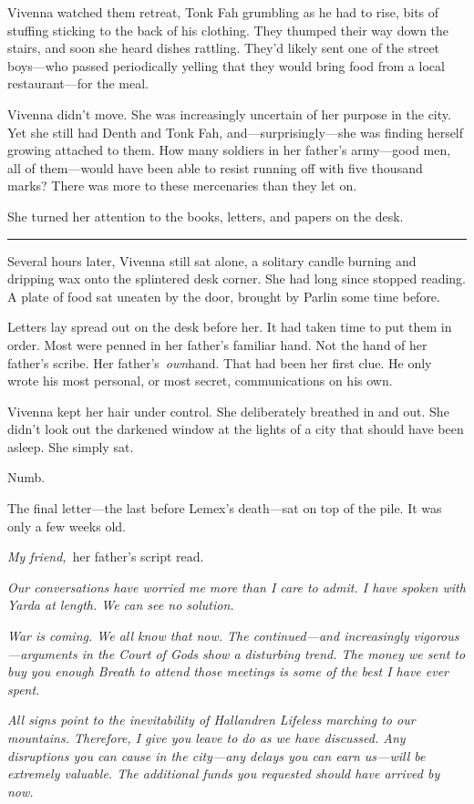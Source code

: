 Vivenna watched them retreat, Tonk Fah grumbling as he had to rise, bits of stuffing sticking to the back of his clothing. They thumped their way down the stairs, and soon she heard dishes rattling. They’d likely sent one of the street boys—who passed periodically yelling that they would bring food from a local restaurant—for the meal.

Vivenna didn’t move. She was increasingly uncertain of her purpose in the city. Yet she still had Denth and Tonk Fah, and—surprisingly—she was finding herself growing attached to them. How many soldiers in her father’s army—good men, all of them—would have been able to resist running off with five thousand marks? There was more to these mercenaries than they let on.

She turned her attention to the books, letters, and papers on the desk.

\bigskip \hrule \bigskip

Several hours later, Vivenna still sat alone, a solitary candle burning and dripping wax onto the splintered desk corner. She had long since stopped reading. A plate of food sat uneaten by the door, brought by Parlin some time before.

Letters lay spread out on the desk before her. It had taken time to put them in order. Most were penned in her father’s familiar hand. Not the hand of her father’s scribe. Her father’s~\textit{own}hand. That had been her first clue. He only wrote his most personal, or most secret, communications on his own.

Vivenna kept her hair under control. She deliberately breathed in and out. She didn’t look out the darkened window at the lights of a city that should have been asleep. She simply sat.

Numb.

The final letter—the last before Lemex’s death—sat on top of the pile. It was only a few weeks old.

\textit{My friend,}~her father’s script read.

\textit{Our conversations have worried me more than I care to admit. I have spoken with Yarda at length. We can see no solution.}

\textit{War is coming. We all know that now. The continued—and increasingly vigorous—arguments in the Court of Gods show a disturbing trend. The money we sent to buy you enough Breath to attend those meetings is some of the best I have ever spent.}

\textit{All signs point to the inevitability of Hallandren Lifeless marching to our mountains. Therefore, I give you leave to do as we have discussed. Any disruptions you can cause in the city—any delays you can earn us—will be extremely valuable. The additional funds you requested should have arrived by now.}

